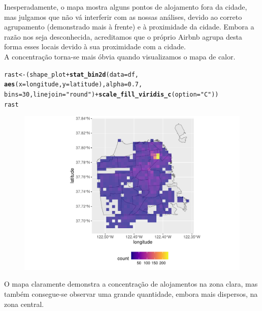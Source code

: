 \documentclass[justified, 11pt]{scrartcl}\usepackage[]{graphicx}\usepackage[]{xcolor}
\makeatletter
\def\maxwidth{ %
  \ifdim\Gin@nat@width>\linewidth
    \linewidth
  \else
    \Gin@nat@width
  \fi
}
\newcommand{\hlnum}[1]{\textcolor[rgb]{0.686,0.059,0.569}{#1}}%
\newcommand{\hlstr}[1]{\textcolor[rgb]{0.192,0.494,0.8}{#1}}%
\newcommand{\hlopt}[1]{\textcolor[rgb]{0,0,0}{#1}}%
\newcommand{\hlstd}[1]{\textcolor[rgb]{0.345,0.345,0.345}{#1}}%
\newcommand{\hlkwb}[1]{\textcolor[rgb]{0.69,0.353,0.396}{#1}}%
\newcommand{\hlkwc}[1]{\textcolor[rgb]{0.333,0.667,0.333}{#1}}%
\newcommand{\hlkwd}[1]{\textcolor[rgb]{0.737,0.353,0.396}{\textbf{#1}}}%
\newenvironment{kframe}{%
 \def\at@end@of@kframe{}%
 \ifinner\ifhmode%
  \def\at@end@of@kframe{\end{minipage}}%
  \begin{minipage}{\columnwidth}%
 \fi\fi%
 \def\FrameCommand##1{\hskip\@totalleftmargin \hskip-\fboxsep
 \colorbox{shadecolor}{##1}\hskip-\fboxsep
     \hskip-\linewidth \hskip-\@totalleftmargin \hskip\columnwidth}%
 \MakeFramed {\advance\hsize-\width
   \@totalleftmargin\z@ \linewidth\hsize
   \@setminipage}}%
 {\par\unskip\endMakeFramed%
 \at@end@of@kframe}
\newenvironment{knitrout}{}{} %
\makeatother
\begin{document}
Inesperadamente, o mapa mostra alguns pontos de alojamento fora da cidade, mas julgamos que não vá interferir com as nossas análises, devido ao correto agrupamento (demonstrado mais à frente) e à proximidade da cidade. Embora a razão nos seja desconhecida, acreditamos que o próprio Airbnb agrupa desta forma esses locais devido à sua proximidade com a cidade. \\
A concentração torna-se mais óbvia quando visualizamos o mapa de calor.
\begin{knitrout}
\color{fgcolor}\begin{kframe}
\begin{alltt}
\hlstd{rast} \hlkwb{<-} \hlstd{(shape_plot} \hlopt{+} \hlkwd{stat_bin2d}\hlstd{(}\hlkwc{data} \hlstd{= df,}
    \hlkwd{aes}\hlstd{(}\hlkwc{x} \hlstd{= longitude,} \hlkwc{y} \hlstd{= latitude),} \hlkwc{alpha} \hlstd{=} \hlnum{0.7}\hlstd{,}
    \hlkwc{bins} \hlstd{=} \hlnum{30}\hlstd{,} \hlkwc{linejoin} \hlstd{=} \hlstr{"round"}\hlstd{)} \hlopt{+} \hlkwd{scale_fill_viridis_c}\hlstd{(}\hlkwc{option} \hlstd{=} \hlstr{"C"}\hlstd{))}
\hlstd{rast}
\end{alltt}
\end{kframe}\begin{figure}
\includegraphics[width=\maxwidth]{figure/chunk-rasterPlaces-1} \end{figure}

\end{knitrout}
O mapa claramente demonstra a concentração de alojamentos na zona clara, mas também consegue-se observar uma grande quantidade, embora mais dispersos, na zona central.
\end{document}
